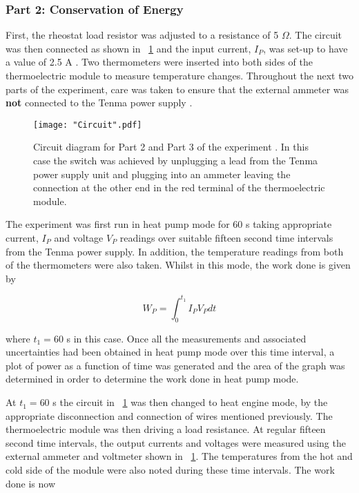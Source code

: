 \documentclass{article}
\newcommand{\figref}[2][\figurename~]{#1\ref{#2}}
\begin{document}
\subsubsection{Part 2: Conservation of Energy}
\label{sssec:part2}

First, the rheostat load resistor was adjusted to a resistance of 5 $\Omega$. The circuit was then connected as shown in \figref{fig:circuit} \cite{Paper02} and the input current, $I_P$, was set-up to have a value of 2.5 A \cite{Paper02}. Two thermometers were inserted into both sides of the thermoelectric module to measure temperature changes. Throughout the next two parts of the experiment, care was taken to ensure that the external ammeter was \textbf{not} connected to the Tenma power supply \cite{Paper02}.

\begin{figure}[h]
\centering
\texttt{[image: "Circuit".pdf]}
\caption{Circuit diagram for Part 2 and Part 3 of the experiment \cite{Paper02}. In this case the switch was achieved by unplugging a lead from the Tenma power supply unit and plugging into an ammeter leaving the connection at the other end in the red terminal of the thermoelectric module.}
\label{fig:circuit}
\end{figure}

\vspace{2mm}  
\noindent
The experiment was first run in heat pump mode for 60 s taking appropriate current, $I_P$ and voltage $V_P$ readings over suitable fifteen second time intervals from the Tenma power supply. In addition, the temperature readings from both of the thermometers were also taken. Whilst in this mode, the work done is given by

\begin{equation}
\label{eq:pump-work}
W_P = \int_{0}^{t_1} I_P V_P dt
\end{equation}

\vspace{2mm}  
\noindent
where $t_1 = 60$ s in this case. Once all the measurements and associated uncertainties had been obtained in heat pump mode over this time interval, a plot of power as a function of time was generated and the area of the graph was determined in order to determine the work done in heat pump mode. 

\vspace{2mm}  
\noindent
At $t_1 = 60$ s the circuit in \figref{fig:circuit} was then changed to heat engine mode, by the appropriate disconnection and connection of wires mentioned previously. The thermoelectric module was then driving a load resistance. At regular fifteen second time intervals, the output currents and voltages were measured using the external ammeter and voltmeter shown in \figref{fig:circuit}. The temperatures from the hot and cold side of the module were also noted during these time intervals. The work done is now
\end{document}
